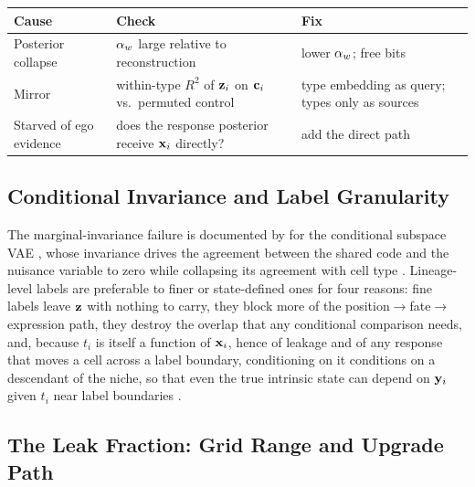  \begin{center}
\begin{tabular}{@{}>{\raggedright\arraybackslash}p{}>{\raggedright\arraybackslash}p{}>{\raggedright\arraybackslash}p{}@{}}
\toprule
Cause & Check & Fix \\
\midrule
Posterior collapse & $\alpha_w$ large relative to reconstruction & lower $\alpha_w$; free bits \\
Mirror & within-type $R^2$ of $\mathbf{z}_i$ on $\mathbf{c}_i$ vs.\ permuted control & type embedding as query; types only as sources \\
Starved of ego evidence & does the response posterior receive $\mathbf{x}_i$ directly? & add the direct path \\
\bottomrule
\end{tabular}
\end{center}

\subsection{Conditional Invariance and Label Granularity}
\label{app:conditional}

 The marginal-invariance failure is documented by \citet{slavutsky2025} for the conditional subspace VAE \citep{klys2018}, whose invariance drives the agreement between the shared code and the nuisance variable to zero while collapsing its agreement with cell type . Lineage-level labels are preferable to finer or state-defined ones for four reasons: fine labels leave $\mathbf{z}$ with nothing to carry, they block more of the position$\to$fate$\to$expression path, they destroy the overlap that any conditional comparison needs, and, because $t_i$ is itself a function of $\mathbf{x}_i$, hence of leakage and of any response that moves a cell across a label boundary, conditioning on it conditions on a descendant of the niche, so that even the true intrinsic state can depend on $\mathbf{y}_i$ given $t_i$ near label boundaries \citep{hernan2004}.

\subsection{The Leak Fraction: Grid Range and Upgrade Path}
\label{app:kappa}

